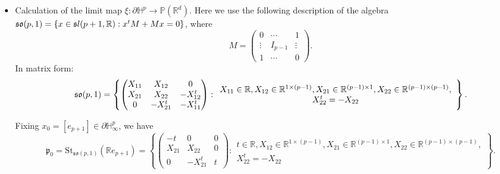 \documentclass{report}
\begin{document}
\begin{itemize}
\begin{proof}
        On the other hand $\Gamma$ is a uniform lattice of $\Isom(\mathbb H^p)$, so the action of $\Gamma$ on $\mathbb H^p$ is cocompact and properly discontinuous.
        By the lemma of Milnor-Svarc, the map $\gamma \mapsto \gamma \cdot o$ is a quasi-isometry, meaning that $\mu(\rho(g)) = Cd(\gamma \cdot o, o ) \geq C|\gamma| - c$ for some $C, c > 0$.
    \end{proof}
    \item Calculation of the limit map $\xi: \partial \mathbb H^p \to \mathbb P(\mathbb R^d)$.
    Here we use the following description of the algebra $\operatorname{{\mathfrak{so}}}(p,1) = \{x \in \mathfrak sl(p+1, \mathbb R): x^t M + M x = 0\}$, where 
    \[
    M = \begin{pmatrix}
        0 & \cdots & 1 \\
        \vdots & I_{p-1} & \vdots\\
        1 & \cdots & 0
    \end{pmatrix}.
    \]
    In matrix form:
    \[
    \operatorname{{\mathfrak{so}}}(p,1) = \left\{
        \begin{pmatrix}
            X_{11} & X_{12} & 0 \\
            X_{21} & X_{22} & -X_{12}^t \\
            0 & -X_{21}^t & -X_{11}^t
        \end{pmatrix}:
        \begin{array}{c}
            X_{11} \in \mathbb R, X_{12} \in \mathbb R^{1 \times (p-1)}, X_{21} \in \mathbb R^{(p-1) \times 1}, X_{22} \in \mathbb R^{(p-1) \times (p-1)}, \\
            X_{22}^t = -X_{22}
        \end{array}
    \right\}.
    \]

    Fixing $x_0 = [e_{p+1}] \in \partial \mathbb H_\infty^p$, we have 
    \[
    \mathfrak p_0 = \mathrm{St}_{\mathfrak{so}(p,1)}(\mathbb R e_{p+1}) = \left\{ 
        \begin{pmatrix}
            -t & 0 & 0 \\
            X_{21} & X_{22} & 0 \\
            0 & -X_{21}^t & t
        \end{pmatrix} : 
        \begin{array}{c}
            t \in \mathbb R, X_{12} \in \mathbb R^{1 \times (p-1)}, X_{21} \in \mathbb R^{(p-1) \times 1}, X_{22} \in \mathbb R^{(p-1) \times (p-1)}, \\
            X_{22}^t = -X_{22}
        \end{array}
     \right\}.
    \]
\end{itemize}
\end{document}
